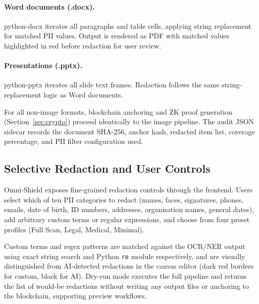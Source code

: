\paragraph{Word documents (.docx).}
python-docx iterates all paragraphs and table cells,
applying string replacement for matched PII values.
Output is rendered as PDF with matched values
highlighted in red before redaction for user review.

\paragraph{Presentations (.pptx).}
python-pptx iterates all slide text frames.
Redaction follows the same string-replacement logic
as Word documents.

For all non-image formats, blockchain anchoring and
ZK proof generation (Section~\ref{sec:crypto})
proceed identically to the image pipeline.
The audit JSON sidecar records the document SHA-256,
anchor hash, redacted item list, coverage percentage,
and PII filter configuration used.

\subsection{Selective Redaction and User Controls}

Omni-Shield exposes fine-grained redaction controls
through the frontend.
Users select which of ten PII categories to redact
(names, faces, signatures, phones, emails, date of
birth, ID numbers, addresses, organisation names,
general dates), add arbitrary custom terms or regular
expressions, and choose from four preset profiles
(Full Scan, Legal, Medical, Minimal).

Custom terms and regex patterns are matched against
the OCR/NER output using exact string search and
Python \texttt{re} module respectively,
and are visually distinguished from AI-detected
redactions in the canvas editor (dark red borders
for custom, black for AI).
Dry-run mode executes the full pipeline and returns
the list of would-be redactions without writing any
output files or anchoring to the blockchain,
supporting preview workflows.
